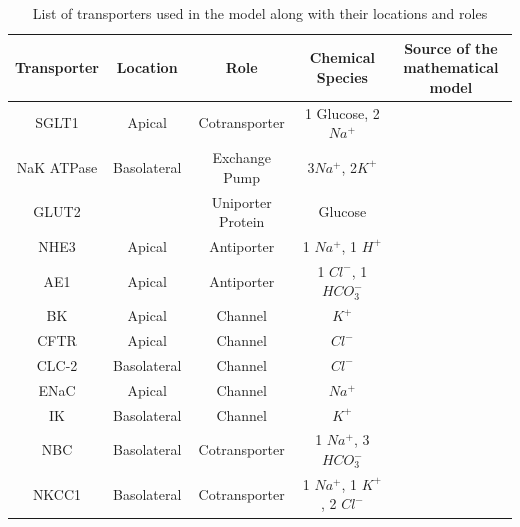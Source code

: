 \documentclass[fleqn,10pt]{physiome}
\begin{document}
\begin{table}[ht!]
	\centering
	\onecolumn
	\caption{\label{Table 1} List of transporters used in the model along with their locations and roles}
	\begin{adjustbox}{width=1\textwidth}
		\begin{tabular}{|c|c|c|c|c|}
			\hline
			Transporter& Location & Role & Chemical Species & \makecell{Source of the\\mathematical model} \\
			\hline
			SGLT1& Apical & Cotransporter &  1 Glucose, 2 $Na^{+}$ & \cite{parent1992electrogenic}\\
			\hline
			NaK ATPase& Basolateral & 
			Exchange Pump & 3$Na^{+}$, 2$K^{+}$ & \cite{thorsen2014transepithelial}\\
			\hline
			GLUT2&\makecell{Apical and Basolateral} & Uniporter Protein  &  Glucose & \cite{pradhan2013carrier}\\
			\hline
			NHE3& Apical& Antiporter & 1 $Na^{+}$, 1 $H^{+}$ & \cite{weinstein1995kinetically}\\
			\hline
			AE1&Apical & Antiporter & 1 $Cl^{-}$, 1 $HCO_{3}^{-}$ & \cite{weinstein2000mathematical}\\
			\hline
			BK& Apical& Channel & $K^{+}$ & \cite{fong2016computational}\\
			\hline
			CFTR&Apical &  Channel &  $Cl^{-}$ & \cite{fong2016computational} \\
			\hline    
			CLC-2&Basolateral &  Channel &  $Cl^{-}$ & \cite{fong2016computational} \\
			\hline     
			ENaC&Apical & Channel & $Na^{+}$ &  \cite{fong2016computational} \\
			\hline
			IK & Basolateral & Channel & $K^{+}$ & \cite{fong2016computational} \\
			\hline
			NBC& Basolateral & Cotransporter  & 1 $Na^{+}$, 3 $HCO_{3}^{-}$ & \cite{ostby2009astrocytic} \\ 
			\hline
			NKCC1& Basolateral & Cotransporter & 1 $Na^{+}$, 1 $K^{+}$, 2 $Cl^{-}$ &  \cite{palk2010dynamic}\\
			\hline  
		\end{tabular}
	\end{adjustbox}
\end{table}\newpage
\end{document}
